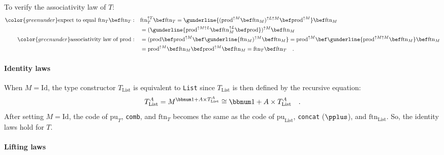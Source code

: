 To verify the associativity law of $T$:
\begin{align*}
{\color{greenunder}\text{expect to equal }\text{ftn}_{T}\bef\text{ftn}_{T}:}\quad & \text{ftn}_{T}^{\uparrow T}\bef\text{ftn}_{T}=\gunderline{(\text{prod}^{\uparrow M}\bef\text{ftn}_{M})^{\uparrow L\uparrow M}\bef\text{prod}^{\uparrow M}}\bef\text{ftn}_{M}\\
 & =(\gunderline{\text{prod}^{\uparrow M\uparrow L}\bef\text{ftn}_{M}^{\uparrow L}\bef\text{prod}})^{\uparrow M}\bef\text{ftn}_{M}\\
{\color{greenunder}\text{associativity law of }\text{prod}:}\quad & =(\text{prod}\bef\text{prod}^{\uparrow M}\bef\gunderline{\text{ftn}_{M})^{\uparrow M}\bef\text{ftn}_{M}}=\text{prod}^{\uparrow M}\bef\gunderline{\text{prod}^{\uparrow M\uparrow M}\bef\text{ftn}_{M}}\bef\text{ftn}_{M}\\
 & =\text{prod}^{\uparrow M}\bef\text{ftn}_{M}\bef\text{prod}^{\uparrow M}\bef\text{ftn}_{M}=\text{ftn}_{T}\bef\text{ftn}_{T}\quad.
\end{align*}


\paragraph{Identity laws}

When $M=\text{Id}$, the type constructor $T_{\text{List}}$ is equivalent
to \lstinline!List! since $T_{\text{List}}$ is then defined by the
recursive equation:
\[
T_{\text{List}}^{A}=M^{\bbnum 1+A\times T_{\text{List}}^{A}}\cong\bbnum 1+A\times T_{\text{List}}^{A}\quad.
\]
After setting $M=\text{Id}$, the code of $\text{pu}_{T}$, \lstinline!comb!,
and $\text{ftn}_{T}$ becomes the same as the code of $\text{pu}_{\text{List}}$,
\lstinline!concat! ($\pplus$), and $\text{ftn}_{\text{List}}$.
So, the identity laws hold for $T$.

\paragraph{Lifting laws}

